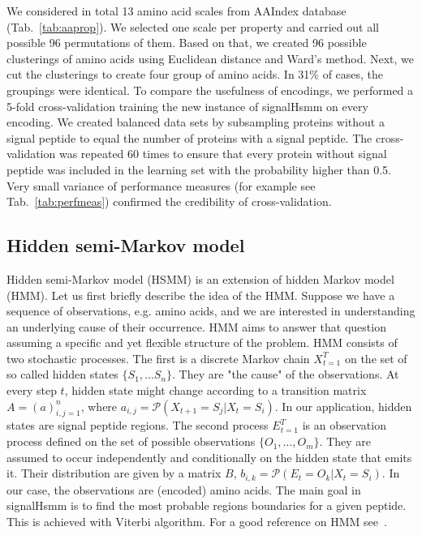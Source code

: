\documentclass[fleqn,10pt,twoside]{gcb15submission}
\begin{document}
We considered in total 13 amino acid scales from AAIndex database~\citep{2008kawashimaaaindex} (Tab.~\ref{tab:aaprop}). We selected one scale per property and carried out all possible 96 permutations of them. Based on that, we created 96 possible clusterings of amino acids using Euclidean distance and Ward's method. Next, we cut the clusterings to create four group of amino acids. In 31\% of cases, the groupings were identical. To compare the usefulness of encodings, we performed a 5-fold cross-validation training the new instance of signalHsmm on every encoding. We created balanced data sets by subsampling proteins without a signal peptide to equal the number of proteins with a signal peptide. The cross-validation was repeated 60 times to ensure that every protein without signal peptide was included in the learning set with the probability higher than 0.5. Very small variance of performance measures (for example see Tab.~\ref{tab:perfmeas})  confirmed the credibility of cross-validation.

\subsection*{Hidden semi-Markov model}
Hidden semi-Markov model (HSMM) is an extension of hidden Markov model (HMM). 
Let us first briefly describe the idea of the HMM. 
Suppose we have a sequence of observations, e.g. amino acids, and we are interested in understanding an underlying cause of their occurrence. 
HMM aims to answer that question assuming a specific and yet flexible structure of the problem.
HMM consists of two stochastic processes. The first is a discrete Markov chain $X_{t=1}^T$ on the set of so called hidden states $\{S_1, \dots S_n\}$.
They are "the cause" of the observations. At every step $t$, hidden state might change according to a transition matrix
$A= (a)_{i,j=1}^n$, where $a_{i,j} = \mathcal{P}(X_{t+1} = S_j | X_t = S_i)$. In our application, hidden states are signal peptide regions.
The second process $E_{t=1}^T$ is an observation process defined on the set of possible observations $\{O_1, \dots, O_m\}$. They are assumed to occur independently and conditionally on the hidden state that emits it. 
Their distribution are given by a matrix $B$, $b_{i,k} = \mathcal{P}(E_t = O_k | X_t = S_i)$.
In our case, the observations are (encoded) amino acids.
The main goal in signalHsmm is to find the most probable regions boundaries for a given peptide. This is achieved with Viterbi algorithm.
For a good reference on HMM see~\citep{1989rabinera}.
\end{document}
